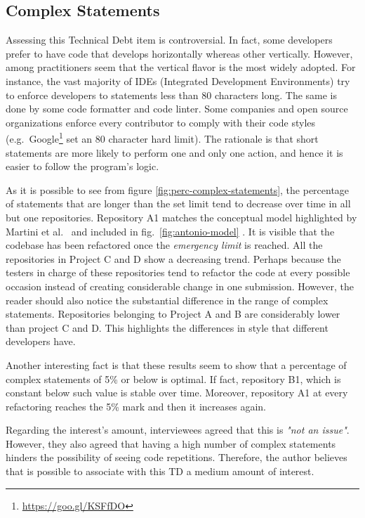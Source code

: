	\subsection{Complex Statements}


	Assessing this Technical Debt item is controversial. In fact, some developers prefer to have code that develops horizontally whereas other vertically. However, among practitioners seem that the vertical flavor is the most widely adopted. For instance, the vast majority of IDEs (Integrated Development Environments) try to enforce developers to statements less than 80 characters long. The same is done by some code formatter and code linter. Some companies and open source organizations enforce every contributor to comply with their code styles (e.g.\ Google\footnote{\href{https://goo.gl/KSFfDO}{https://goo.gl/KSFfDO}} set an 80 character hard limit). The rationale is that short statements are more likely to perform one and only one action, and hence it is easier to follow the program's logic.

    As it is possible to see from figure \ref{fig:perc-complex-statements}, the percentage of statements that are longer than the set limit tend to decrease over time in all but one repositories. Repository A1 matches the conceptual model highlighted by Martini et al.\ \cite{martini2014architecture} and included in fig.\ \ref{fig:antonio-model} . It is visible that the codebase has been refactored once the \textit{emergency limit} is reached. All the repositories in Project C and D show a decreasing trend. Perhaps because the testers in charge of these repositories tend to refactor the code at every possible occasion instead of creating considerable change in one submission. However, the reader should also notice the substantial difference in the range of complex statements. Repositories belonging to Project A and B are considerably lower than project C and D. This highlights the differences in style that different developers have.

    Another interesting fact is that these results seem to show that a percentage of complex statements of 5\% or below is optimal. If fact, repository B1, which is constant below such value is stable over time. Moreover, repository A1 at every refactoring reaches the 5\% mark and then it increases again.

     \label{sec:disc-rq3-complex-statements}
    Regarding the interest's amount, interviewees agreed that this is \textit{"not an issue"}. However, they also agreed that having a high number of complex statements hinders the possibility of seeing code repetitions. Therefore, the author believes that is possible to associate with this TD a medium amount of interest.


